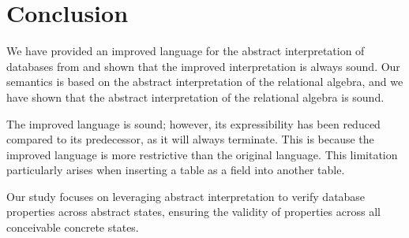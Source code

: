 \section{Conclusion} \label{sec:conclusion}
We have provided an improved language for the abstract interpretation of databases from \cite{halder_abstract_2012} and shown that the improved interpretation is always sound.
Our semantics is based on the abstract interpretation of the relational algebra, and we have shown that the abstract interpretation of the relational algebra is sound.

The improved language is sound; however, its expressibility has been reduced compared to its predecessor, as it will always terminate.
This is because the improved language is more restrictive than the original language.
This limitation particularly arises when inserting a table as a field into another table.

Our study focuses on leveraging abstract interpretation to verify database properties across abstract states, ensuring the validity of properties across all conceivable concrete states.




